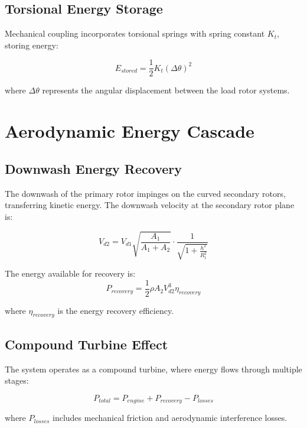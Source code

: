 \documentclass[12pt,a4paper]{article}
\begin{document}
\subsection{Torsional Energy Storage}

Mechanical coupling incorporates torsional springs with spring constant $K_t$, storing energy:

\begin{equation}
E_{stored} = \frac{1}{2}K_t(\Delta\theta)^2
\end{equation}

where $\Delta\theta$ represents the angular displacement between the load rotor systems.

\section{Aerodynamic Energy Cascade}

\subsection{Downwash Energy Recovery}

The downwash of the primary rotor impinges on the curved secondary rotors, transferring kinetic energy. The downwash velocity at the secondary rotor plane is:

\begin{equation}
V_{d2} = V_{d1}\sqrt{\frac{A_1}{A_1 + A_2}} \cdot \frac{1}{\sqrt{1 + \frac{h^2}{R_1^2}}}
\end{equation}

The energy available for recovery is:
\begin{equation}
P_{recovery} = \frac{1}{2}\rho A_2 V_{d2}^3 \eta_{recovery}
\end{equation}

where $\eta_{recovery}$ is the energy recovery efficiency.

\subsection{Compound Turbine Effect}

The system operates as a compound turbine, where energy flows through multiple stages:

\begin{equation}
P_{total} = P_{engine} + P_{recovery} - P_{losses}
\end{equation}

where $P_{losses}$ includes mechanical friction and aerodynamic interference losses.
\end{document}
